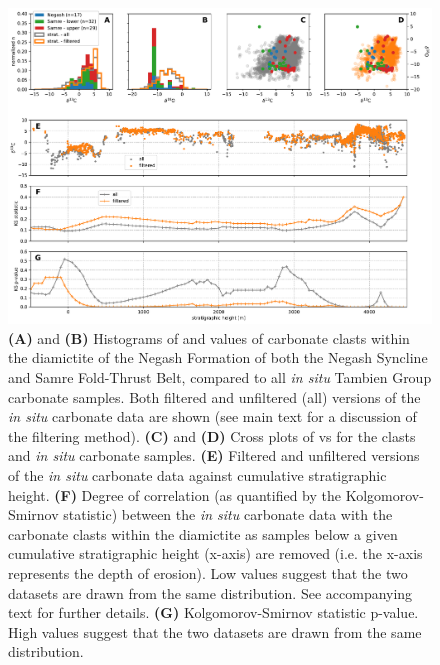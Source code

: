 \begin{figure}[h!]
\begin{center}
	\includegraphics[width=\textwidth]{figures/Tambien/clast-analysis-pval.pdf}
	\caption[Geochemistry of clasts within the diamictite of the Negash Formation.]{\textbf{(A)} and \textbf{(B)} Histograms of \dC and \dO values of carbonate clasts within the diamictite of the Negash Formation of both the Negash Syncline and Samre Fold-Thrust Belt, compared to all \textit{in situ} Tambien Group carbonate samples. Both filtered and unfiltered (all) versions of the \textit{in situ} carbonate data are shown (see main text for a discussion of the filtering method). \textbf{(C)} and \textbf{(D)} Cross plots of \dC vs \dO for the clasts and \textit{in situ} carbonate samples. \textbf{(E)} Filtered and unfiltered versions of the \textit{in situ} carbonate \dC data against cumulative stratigraphic height. \textbf{(F)} Degree of correlation (as quantified by the Kolgomorov-Smirnov statistic) between the \textit{in situ} carbonate \dC data with the carbonate clasts within the diamictite as samples below a given cumulative stratigraphic height (x-axis) are removed (i.e. the x-axis represents the depth of erosion). Low values suggest that the two datasets are drawn from the same distribution. See accompanying text for further details. \textbf{(G)} Kolgomorov-Smirnov statistic p-value. High values suggest that the two datasets are drawn from the same distribution.}
	\label{fig:clast-analysis-pval}
\end{center}
\end{figure}

